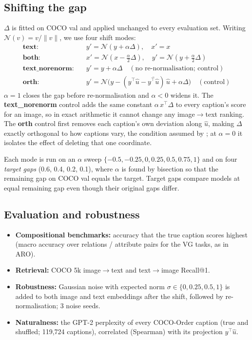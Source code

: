 \documentclass[11pt,a4paper]{article}
\newcommand{\uhat}{\hat{u}}
\newcommand{\gapv}{\Delta}
\begin{document}
\subsection{Shifting the gap}
$\gapv$ is fitted on COCO val and applied unchanged to every evaluation set. Writing
$\mathcal{N}(v)=v/\lVert v\rVert$, we use four shift modes:
\begin{align}
\textbf{text:}\quad & y'=\mathcal{N}(y+\alpha\gapv), \quad x'=x \label{eq:text}\\
\textbf{both:}\quad & x'=\mathcal{N}(x-\tfrac{\alpha}{2}\gapv),\quad y'=\mathcal{N}(y+\tfrac{\alpha}{2}\gapv)\\
\textbf{text\_norenorm:}\quad & y'=y+\alpha\gapv \quad(\text{no re-normalisation; control})\\
\textbf{orth:}\quad & y'=\mathcal{N}\big(y-(y^\top\uhat-\overline{y^\top\uhat})\,\uhat+\alpha\gapv\big)\quad(\text{control})
\end{align}
$\alpha=1$ closes the gap before re-normalisation and $\alpha<0$ widens it. The \textbf{text\_norenorm}
control adds the same constant $\alpha\,x^\top\gapv$ to every caption's score for an image, so in exact
arithmetic it cannot change any image$\to$text ranking. The \textbf{orth} control first removes each
caption's own deviation along $\uhat$, making $\gapv$ exactly orthogonal to how captions vary, the
condition assumed by \cite{chowers}; at $\alpha=0$ it isolates the effect of deleting that one coordinate.

Each mode is run on an $\alpha$ sweep $\{-0.5,-0.25,0,0.25,0.5,0.75,1\}$ and on four \emph{target gaps}
(0.6, 0.4, 0.2, 0.1), where $\alpha$ is found by bisection so that the remaining gap on COCO val equals
the target. Target gaps compare models at equal remaining gap even though their original gaps differ.

\subsection{Evaluation and robustness}
\begin{itemize}
\item \textbf{Compositional benchmarks:} accuracy that the true caption scores highest (macro accuracy
over relations / attribute pairs for the VG tasks, as in ARO).
\item \textbf{Retrieval:} COCO 5k image$\to$text and text$\to$image Recall@1.
\item \textbf{Robustness:} Gaussian noise with expected norm $\sigma\in\{0,0.25,0.5,1\}$ is added to both
image and text embeddings after the shift, followed by re-normalisation; 3 noise seeds.
\item \textbf{Naturalness:} the GPT-2 \cite{gpt2} perplexity of every COCO-Order caption (true and
shuffled; 119,724 captions), correlated (Spearman) with its projection $y^\top\uhat$.
\end{itemize}
\end{document}
